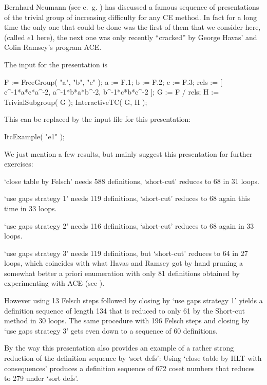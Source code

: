 
Bernhard Neumann (see e.~g. \cite{Neu79}) has discussed a famous
sequence of presentations of the trivial group of increasing
difficulty for any CE method. In fact for a long time the only one
that could be done was the first of them that we consider here,
(called $e1$ here), the next one was only recently ``cracked'' by George
Havas' and Colin Ramsey's program ACE.

The {\GAP} input for the presentation is


\begintt
F := FreeGroup( "a", "b", "c" );
a := F.1; b := F.2; c := F.3;
rels := [ c^-1*a*c*a^-2, a^-1*b*a*b^-2, b^-1*c*b*c^-2 ];
G := F / rels;
H := TrivialSubgroup( G );
InteractiveTC( G, H );
\endtt

This can be replaced by the input file for this presentation:

\begintt
ItcExample( "e1" );
\endtt

We just mention a few results, but mainly suggest this presentation
for further exercises:

`close table by Felsch' needs 588 definitions, `short-cut' reduces
to 68 in 31 loops.

`use gaps strategy 1' needs 119 definitions, `short-cut' reduces to
68 again this time in 33 loops.

`use gaps strategy 2' needs 116 definitions, `short-cut' reduces to
68 again in 33 loops.

`use gaps strategy 3' needs 119 definitions, but `short-cut' reduces
to 64 in 27 loops, which coincides with what Havas and Ramsey got
by hand pruning a somewhat better a priori enumeration with only 81
definitions obtained by experimenting with ACE (see \cite{HR99b}).

However using 13 Felsch steps followed by closing by `use gaps
strategy 1' yields a definition sequence of length 134 that is
reduced to only 61 by the Short-cut method in 30 loops. The same
procedure with 196 Felsch steps and closing by `use gaps strategy 3'
gets even down to a sequence of 60 definitions.

By the way this presentation also provides an example of a rather
strong reduction of the definition sequence by `sort defs': Using
`close table by HLT with consequences' produces a definition sequence
of 672 coset numbers that reduces to 279 under `sort defs'.



